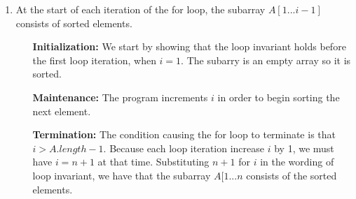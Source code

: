 \documentclass[a4paper]{article}
\begin{document}
\begin{enumerate}[label=\alph*)]
\begin{itemize}[itemindent=5em]
             
        \end{itemize}

        \item At the start of each iteration of the for loop, the subarray 
        $A[1...i-1]$ consists of sorted elements.

        \begin{itemize}[itemindent=5em]
            
            \item[\textbf{Initialization:}] We start by showing that the loop invariant 
            holds before the first loop iteration, when $i = 1$. The subarry is an empty
            array so it is sorted.

            \item[\textbf{Maintenance:}] 
            The program increments $i$ in order to begin sorting the next element.
            
            \item[\textbf{Termination:}] 
            The condition causing the for loop to terminate is that $i > A.length-1$. Because
            each loop iteration increase $i$ by 1, we must have $i = n + 1$ at that time.
            Substituting $n + 1$ for $i$ in the wording of loop invariant, we have that the
            subarray $A[1...n$ consists of the sorted elements.
            
             
        \end{itemize}

    \end{enumerate}
\end{document}
